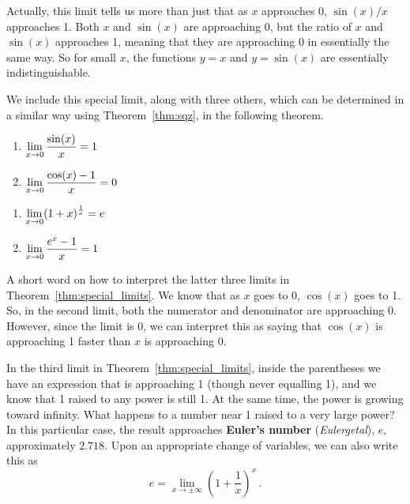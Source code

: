 Actually, this limit tells us more than just that as $x$ approaches 0, $\sin(x)/x$ approaches 1. Both $x$ and $\sin (x)$ are approaching 0, but the ratio of $x$ and $\sin (x)$ approaches 1, meaning that they are approaching 0 in essentially the same way. So for small $x$, the functions $y=x$ and $y=\sin (x)$ are essentially indistinguishable.

We include this special limit, along with three others, which can be determined in a similar way using Theorem~\ref{thm:sqz}, in the following theorem.


\begin{theorem}\label{thm:special_limits}
\noindent\begin{minipage}[t]{.5\textwidth}
\begin{enumerate}
	\item		$\displaystyle \lim_{x\to 0} \frac{\sin (x)}{x} = 1$
	\item		$\displaystyle \lim_{x\to 0} \frac{\cos( x)-1}{x} = 0$
\end{enumerate}
\end{minipage}
\begin{minipage}[t]{.5\textwidth}
\begin{enumerate}\addtocounter{enumi}{2}
	\item		$\displaystyle \lim_{x\to 0} (1+x)^\frac1x = e$
	\item		$\displaystyle \lim_{x\to 0} \frac{e^x-1}{x} = 1$
\end{enumerate}
\end{minipage}
\end{theorem}

A short word on how to interpret the latter three limits in Theorem~\ref{thm:special_limits}. We know that as $x$ goes to 0, $\cos (x)$ goes to 1. So, in the second limit, both the numerator and denominator are approaching 0. However, since the limit is 0, we can interpret this as saying that $\cos (x)$ is approaching 1 faster than $x$ is approaching 0.

In the third limit in Theorem~\ref{thm:special_limits}, inside the parentheses we have an expression that is approaching 1 (though never equalling 1), and we know that 1 raised to any power is still 1. At the same time, the power is growing toward infinity. What happens to a number near 1 raised to a very large power? In this particular case, the result approaches \textbf{Euler's number} (\textit{Eulergetal}), $e$, approximately $2.718.$ Upon an appropriate change of variables, we can also write this as
$$e=\displaystyle\lim_{x\rightarrow \pm\infty} \left( 1+\dfrac{1}{x}\right)^x \,.$$
 

